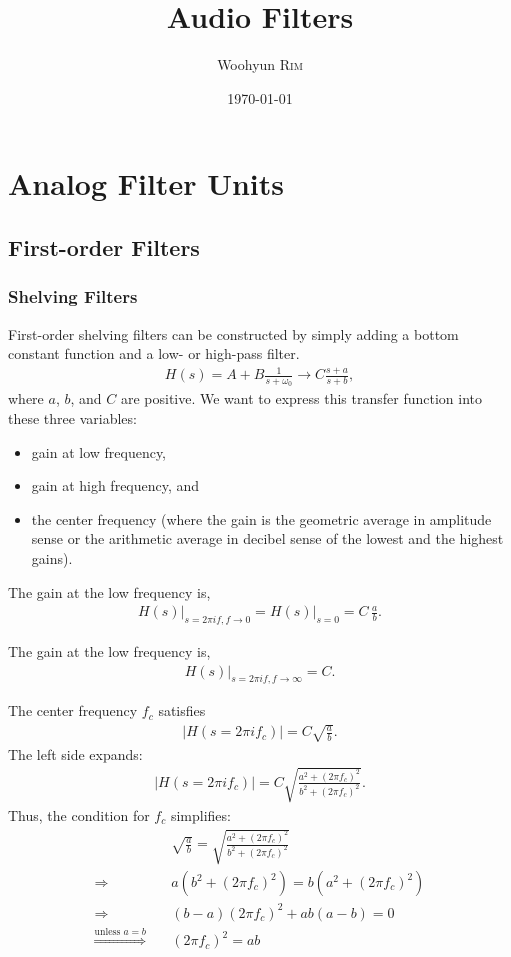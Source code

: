 \documentclass{article}
\title{Audio Filters}
\author{Woohyun \textsc{Rim}}
\date{\today}
\begin{document}
\maketitle
\tableofcontents
\section{Analog Filter Units}
\subsection{First-order Filters}
\subsubsection{Shelving Filters}
First-order shelving filters can be constructed by simply adding a bottom constant function and a low- or high-pass filter. \cite{first-order-shelving} 
\begin{align}
H(s) = A + B \frac{1}{s+\omega_0} \rightarrow C\frac{s+a}{s+b},
\end{align}
where $a$, $b$, and $C$ are positive.
We want to express this transfer function into these three variables:
\begin{itemize}
\item gain at low frequency,
\item gain at high frequency, and
\item the center frequency (where the gain is the geometric average in amplitude sense or the arithmetic average in decibel sense of the lowest and the highest gains).
\end{itemize}
\par
The gain at the low frequency is,
\begin{align}
\left.H(s)\right|_{s=2\pi i f, f\rightarrow 0} = \left.H(s)\right|_{s=0} = C\,\frac{a}{b}.
\end{align}
\par
The gain at the low frequency is,
\begin{align}
\left.H(s)\right|_{s=2\pi i f, f\rightarrow \infty} = C.
\end{align}
\par
The center frequency $f_c$ satisfies
\begin{align}
\left|H(s=2\pi i f_c)\right| = C\sqrt{\frac{a}{b}}.
\end{align}
The left side expands:
\begin{align}
\left|H(s=2\pi i f_c)\right| =C \sqrt{\frac{a^2+(2\pi f_c)^2}{b^2+(2\pi f_c)^2}}.
\end{align}
Thus, the condition for $f_c$ simplifies:
\begin{align}
&\sqrt{\frac{a}{b}}
 = 
 \sqrt{\frac{a^2+(2\pi f_c)^2}{b^2+(2\pi f_c)^2}}
\\ \Rightarrow\quad&
a(b^2+(2\pi f_c)^2) = b(a^2+(2\pi f_c)^2)
\\ \Rightarrow\quad&
(b-a)(2\pi f_c)^2 + ab(a-b) = 0
\\ \stackrel{\text{unless $a=b$}}{\Rightarrow}\quad&
(2\pi f_c)^2 = ab
\end{align}
\end{document}
